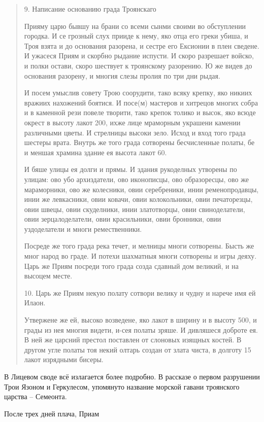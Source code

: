 \begin{quotation}
9. Написание основанию града Троянскаго

Прияму царю бывшу на брани со всеми сынми своими во обступлении городка. И се грозный слух прииде к нему, яко отца его греки убиша, и Троя взята и до основания разорена, и сестре его Ексионии в плен сведене. И ужасеся Приям и скорбно рыдание испусти. И скоро разрешает войско, и полки остави, скоро шествует к троянскому разорению. Ю же видев до основания разорену, и многия слезы пролия по три дни рыдая.

И посем умыслив совету Трою соорудити, тако всяку крепку, яко никиих вражиих нахожений боятися. И посе(м) мастеров и хитрецов многих собра и в каменной рези повеле творити, тако крепок толико и высок, яко всюде окрест в высоту лакот 200, ихже лице мраморным украшени камении различными цветы. И стрелницы высоки зело. Исход и вход того града шестеры врата. Внутрь же того града сотворены бесчисленные полаты, бе и меншая храмина здание ея высота лакот 60.

И бяше улицы ея долги и прямы. И здания рукоделных утворены по улицам: ово убо архиздатели, ово иконописцы, ово образоресцы, ово же мараморники, ово же колесники, овии серебреники, инии ременопродавцы, инии же левкасники, овии ковачи, овии колокольники, овии печаторезцы, овии швецы, овии скуделники, инии златотворцы, овии свиноделатели, овии зерцалоделатели, овии красильники, овии бронники, овии уздоделатели и многи ремественники.

Посреде же того града река течет, и мелницы многи сотворены. Бысть же мног народ во граде. И потехи шахматныя многи сотворены и игры деяху. Царь же Приям посреди того града созда сдавный дом великий, и на высоцем месте.

10. Царь же Приям некую полату сотвори велику и чудну и нарече имя ей Илаон.

Утвержене же ей, высоко возведене, яко лакот в ширину и в высоту 500, и грады из нея многия видети, и-сея полаты зряше. И дивляшеся доброте ея. В ней же царсний престол поставлен от слоновых изящных костей. В другом угле полаты тоя некий олтарь создан от злата чиста, в долготу 15 лакот изрядными бисеры.
\end{quotation}

В Лицевом своде всё излагается более подробно. В рассказе о первом разрушении Трои Язоном и Геркулесом, упомянуто название морской гавани троянского царства – Семеонта.

После трех дней плача, Приам 

